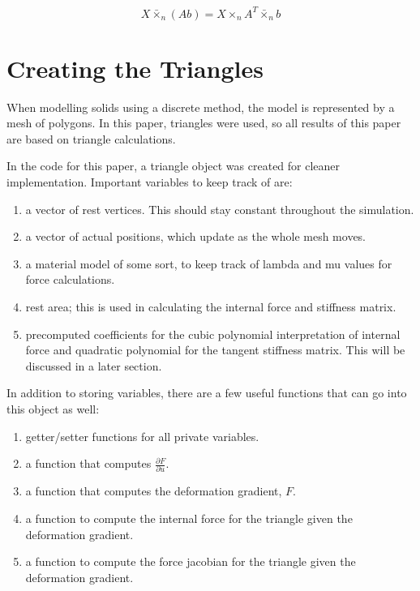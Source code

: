 \documentclass[twocolumn,10pt]{asme2ej}
\begin{document}
\begin{equation}
X \bar{\times}_n (Ab) = X \times_n A^T \bar{\times}_n b
\label{eq_productDecompose}
\end{equation}

\section{Creating the Triangles}

When modelling solids using a discrete method, the model is represented by a mesh of polygons. In this paper, triangles were
used, so all results of this paper are based on triangle calculations.

In the code for this paper, a triangle object was created for cleaner implementation. Important variables to keep track of are:
\begin{enumerate}
  \item a vector of rest vertices. This should stay constant throughout the simulation.
  \item a vector of actual positions, which update as the whole mesh moves.
  \item a material model of some sort, to keep track of lambda and mu values for force calculations.
  \item rest area; this is used in calculating the internal force and stiffness matrix.
  \item precomputed coefficients for the cubic polynomial interpretation of internal force and quadratic polynomial
  for the tangent stiffness matrix. This will be discussed in a later section.
\end{enumerate}

In addition to storing variables, there are a few useful functions that can go into this object as well:
\begin{enumerate}
  \item getter/setter functions for all private variables.
  \item a function that computes $\frac{\partial F}{\partial u}$.
  \item a function that computes the deformation gradient, $F$.
  \item a function to compute the internal force for the triangle given the deformation gradient.
  \item a function to compute the force jacobian for the triangle given the deformation gradient.
\end{enumerate}
\end{document}
